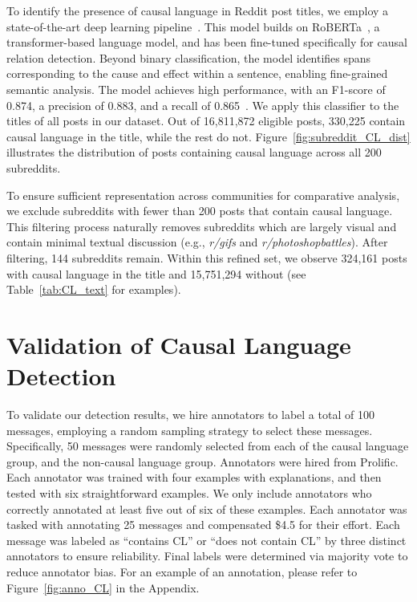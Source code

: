 \documentclass[acmsmall]{acmart}
\begin{document}
To identify the presence of causal language in Reddit post titles, we employ a state-of-the-art deep learning pipeline~\cite{priniski2023pipeline}. This model builds on RoBERTa~\cite{liu2019roberta}, a transformer-based language model, and has been fine-tuned specifically for causal relation detection. Beyond binary classification, the model identifies spans corresponding to the cause and effect within a sentence, enabling fine-grained semantic analysis. The model achieves high performance, with an F1-score of 0.874, a precision of 0.883, and a recall of 0.865~\cite{priniski2023pipeline}. We apply this classifier to the titles of all posts in our dataset.
Out of 16,811,872 eligible posts, 330,225 contain causal language in the title, while the rest do not. Figure~\ref{fig:subreddit_CL_dist} illustrates the distribution of posts containing causal language across all 200 subreddits. 

To ensure sufficient representation across communities for comparative analysis, we exclude subreddits with fewer than 200 posts that contain causal language. 
This filtering process naturally removes subreddits which are largely visual and contain minimal textual discussion (e.g., \textit{r/gifs} and \textit{r/photoshopbattles}).
After filtering, 144 subreddits remain. Within this refined set, we observe 324,161 posts with causal language in the title and 15,751,294 without (see Table~\ref{tab:CL_text} for examples). 








\section{Validation of Causal Language Detection}

To validate our detection results, we hire annotators to label a total of 100 messages, employing a random sampling strategy to select these messages. Specifically, 50 messages were randomly selected from each of the causal language group, and the non-causal language group. Annotators were hired from Prolific. Each annotator was trained with four examples with explanations, and then tested with six straightforward examples. We only include annotators who correctly annotated at least five out of six of these examples. Each annotator was tasked with annotating 25 messages and compensated \$4.5 for their effort. Each message was labeled as ``contains CL'' or  ``does not contain CL'' by three distinct annotators to ensure reliability. Final labels were determined via majority vote to reduce annotator bias. For an example of an annotation, please refer to Figure~\ref{fig:anno_CL} in the Appendix.
\end{document}
